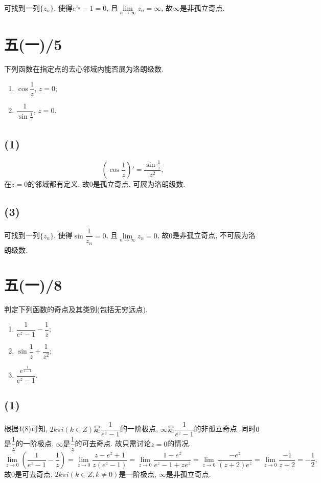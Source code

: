 \documentclass[11pt,a4paper]{article}
\begin{document}
可找到一列$\{z_n\}$, 使得$e^{z_n}-1=0$, 且$\lim\limits_{n\to\infty}z_n=\infty$, 故$\infty$是非孤立奇点.

\section{五(一)/5}
\begin{problem}
下列函数在指定点的去心邻域内能否展为洛朗级数.
\begin{enumerate}
  \item $\cos\dfrac{1}{z}$, $z=0$;
        \addtocounter{enumi}{1}
  \item $\dfrac{1}{\sin\frac{1}{z}}$, $z=0$.
\end{enumerate}
\end{problem}
\subsection*{(1)}
$$\left(\cos\frac{1}{z}\right)'=\frac{\sin\frac{1}{z}}{z^2},$$
在$z=0$的邻域都有定义, 故$0$是孤立奇点, 可展为洛朗级数.

\subsection*{(3)}
可找到一列$\{z_n\}$, 使得$\sin\dfrac{1}{z_n}=0$, 且$\lim\limits_{n\to\infty}z_n=0$, 故$0$是非孤立奇点, 不可展为洛朗级数.

\section{五(一)/8}
\begin{problem}
判定下列函数的奇点及其类别(包括无穷远点).
\begin{enumerate}
  \item $\dfrac{1}{e^z-1}-\dfrac{1}{z}$;
        \addtocounter{enumi}{1}
  \item $\sin\dfrac{1}{z}+\dfrac{1}{z^2}$;
        \addtocounter{enumi}{1}
  \item $\dfrac{e^{\frac{1}{z-1}}}{e^z-1}$.
\end{enumerate}
\end{problem}
\subsection*{(1)}
根据4(8)可知, $2k\pi i(k\in Z)$是$\dfrac{1}{e^z-1}$的一阶极点, $\infty$是$\dfrac{1}{e^z-1}$的非孤立奇点. 同时$0$是$\dfrac{1}{z}$的一阶极点, $\infty$是$\dfrac{1}{z}$的可去奇点. 故只需讨论$z=0$的情况.
$$\lim_{z\to0}\left(\frac{1}{e^z-1}-\frac{1}{z}\right)=\lim_{z\to0}\frac{z-e^z+1}{z(e^z-1)}=\lim_{z\to0}\frac{1-e^z}{e^z-1+ze^z}=\lim_{z\to0}\frac{-e^z}{(z+2)e^z}=\lim_{z\to0}\frac{-1}{z+2}=-\frac{1}{2},$$
故$0$是可去奇点, $2k\pi i(k\in Z,k\neq0)$是一阶极点, $\infty$是非孤立奇点.
\end{document}
